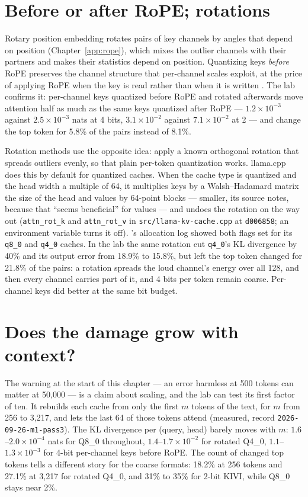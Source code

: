 \section{Before or after RoPE; rotations}

Rotary position embedding rotates pairs of key channels by angles that depend
on position (Chapter~\ref{app:rope}), which mixes the outlier channels with
their partners and makes their statistics depend on position. Quantizing keys
\emph{before} RoPE preserves the channel structure that per-channel scales
exploit, at the price of applying RoPE when the key is read rather than when it
is written \cite{hooper2024kvquant}. The lab confirms it: per-channel keys
quantized before RoPE and rotated afterwards move attention half as much as the
same keys quantized after RoPE --- $1.2\times10^{-3}$ against $2.5\times10^{-3}$
nats at 4 bits, $3.1\times10^{-2}$ against $7.1\times10^{-2}$ at 2 --- and change
the top token for 5.8\% of the pairs instead of 8.1\%.

Rotation methods use the opposite idea: apply a known orthogonal rotation that
spreads outliers evenly, so that plain per-token quantization works. llama.cpp
does this by default for quantized caches. When the cache type is quantized and
the head width a multiple of 64, it multiplies keys by a Walsh--Hadamard matrix
the size of the head and values by 64-point blocks --- smaller, its source notes,
because that ``seems beneficial'' for values --- and undoes the rotation on the
way out (\texttt{attn\_rot\_k} and \texttt{attn\_rot\_v} in
\texttt{src/llama-kv-cache.cpp} at \texttt{d006858}; an environment variable
turns it off). 's allocation log showed both flags set for its
\texttt{q8\_0} and \texttt{q4\_0} caches. In the lab the same rotation cut
\texttt{q4\_0}'s KL divergence by 40\% and its output error from 18.9\% to
15.8\%, but left the top token changed for 21.8\% of the pairs: a rotation spreads
the loud channel's energy over all 128, and then every channel carries part of
it, and 4 bits per token remain coarse. Per-channel keys did better at the same
bit budget.

\section{Does the damage grow with context?}

The warning at the start of this chapter --- an error harmless at 500 tokens can
matter at 50,000 --- is a claim about scaling, and the lab can test its first
factor of ten. It rebuilds each cache from only the first $m$ tokens of the text,
for $m$ from 256 to 3,217, and lets the last 64 of those tokens attend (measured,
record \texttt{2026-09-26-m1-pass3}). The KL divergence per (query, head) barely
moves with $m$: $1.6$--$2.0\times10^{-4}$ nats for Q8\_0 throughout,
$1.4$--$1.7\times10^{-2}$ for rotated Q4\_0, $1.1$--$1.3\times10^{-3}$ for 4-bit
per-channel keys before RoPE. The count of changed top tokens tells a different
story for the coarse formats: 18.2\% at 256 tokens and 27.1\% at 3,217 for rotated
Q4\_0, and 31\% to 35\% for 2-bit KIVI, while Q8\_0 stays near 2\%.

